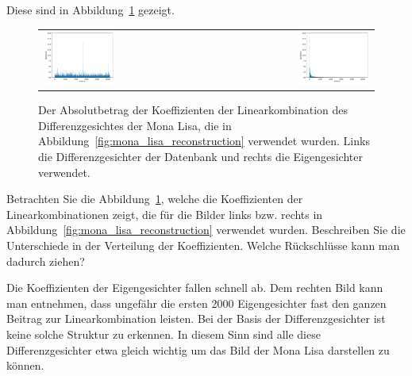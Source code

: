 Diese sind in Abbildung~\ref{fig:coef} gezeigt.
\begin{figure}[ht]
	\centering
	\begin{tabular}{lr}
		\includegraphics[width=0.45\textwidth]{images/eigenfaces/naive_coef} & \includegraphics[width=0.45\textwidth]{images/eigenfaces/eigen_coef} \\
	\end{tabular}
	\caption{Der Absolutbetrag der Koeffizienten der Linearkombination des Differenzgesichtes der Mona Lisa, die in Abbildung~\ref{fig:mona_lisa_reconstruction} verwendet wurden. Links die Differenzgesichter der Datenbank und rechts die Eigengesichter verwendet.}
	\label{fig:coef}
\end{figure}
\begin{aufgabe}
	Betrachten Sie die Abbildung~\ref{fig:coef}, welche die Koeffizienten der Linearkombinationen zeigt, die für die Bilder links bzw. rechts in Abbildung~\ref{fig:mona_lisa_reconstruction} verwendet wurden.
	Beschreiben Sie die Unterschiede in der Verteilung der Koeffizienten.
	Welche Rückschlüsse kann man dadurch ziehen?
\end{aufgabe}
\begin{losung*}
	Die Koeffizienten der Eigengesichter fallen schnell ab.
	Dem rechten Bild kann man entnehmen, dass ungefähr die ersten 2000 Eigengesichter fast den ganzen Beitrag zur Linearkombination leisten.
	Bei der Basis der Differenzgesichter ist keine solche Struktur zu erkennen.
	In diesem Sinn sind alle diese Differenzgesichter etwa gleich wichtig um das Bild der Mona Lisa darstellen zu können.
\end{losung*}
